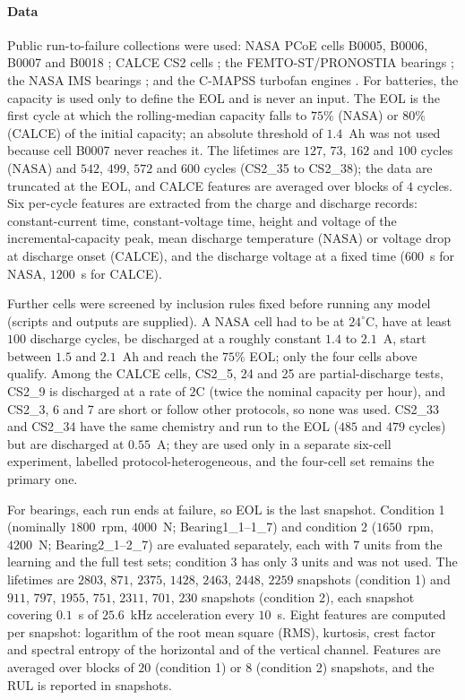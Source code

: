 \documentclass[preprint,12pt]{elsarticle}
\theoremstyle{definition}
\begin{document}
\paragraph{Data} Public run-to-failure collections were used: NASA PCoE cells B0005, B0006, B0007 and B0018 \cite{saha2007}; CALCE CS2 cells \cite{he2011}; the FEMTO-ST/PRONOSTIA bearings \cite{nectoux2012}; the NASA IMS bearings \cite{lee2007,qiu2006}; and the C-MAPSS turbofan engines \cite{saxena2008}. For batteries, the capacity is used only to define the EOL and is never an input. The EOL is the first cycle at which the rolling-median capacity falls to $75\%$ (NASA) or $80\%$ (CALCE) of the initial capacity; an absolute threshold of $1.4$~Ah was not used because cell B0007 never reaches it. The lifetimes are $127$, $73$, $162$ and $100$ cycles (NASA) and $542$, $499$, $572$ and $600$ cycles (CS2\_35 to CS2\_38); the data are truncated at the EOL, and CALCE features are averaged over blocks of $4$ cycles. Six per-cycle features are extracted from the charge and discharge records: constant-current time, constant-voltage time, height and voltage of the incremental-capacity peak, mean discharge temperature (NASA) or voltage drop at discharge onset (CALCE), and the discharge voltage at a fixed time ($600$~s for NASA, $1200$~s for CALCE).

Further cells were screened by inclusion rules fixed before running any model (scripts and outputs are supplied). A NASA cell had to be at $24^\circ$C, have at least $100$ discharge cycles, be discharged at a roughly constant $1.4$ to $2.1$~A, start between $1.5$ and $2.1$~Ah and reach the $75\%$ EOL; only the four cells above qualify. Among the CALCE cells, CS2\_5, 24 and 25 are partial-discharge tests, CS2\_9 is discharged at a rate of $2$C (twice the nominal capacity per hour), and CS2\_3, 6 and 7 are short or follow other protocols, so none was used. CS2\_33 and CS2\_34 have the same chemistry and run to the EOL ($485$ and $479$ cycles) but are discharged at $0.55$~A; they are used only in a separate six-cell experiment, labelled protocol-heterogeneous, and the four-cell set remains the primary one.

For bearings, each run ends at failure, so EOL is the last snapshot. Condition 1 (nominally $1800$~rpm, $4000$~N; Bearing1\_1--1\_7) and condition 2 ($1650$~rpm, $4200$~N; Bearing2\_1--2\_7) are evaluated separately, each with $7$ units from the learning and the full test sets; condition 3 has only $3$ units and was not used. The lifetimes are $2803$, $871$, $2375$, $1428$, $2463$, $2448$, $2259$ snapshots (condition 1) and $911$, $797$, $1955$, $751$, $2311$, $701$, $230$ snapshots (condition 2), each snapshot covering $0.1$~s of $25.6$~kHz acceleration every $10$~s. Eight features are computed per snapshot: logarithm of the root mean square (RMS), kurtosis, crest factor and spectral entropy of the horizontal and of the vertical channel. Features are averaged over blocks of $20$ (condition 1) or $8$ (condition 2) snapshots, and the RUL is reported in snapshots.
\end{document}
